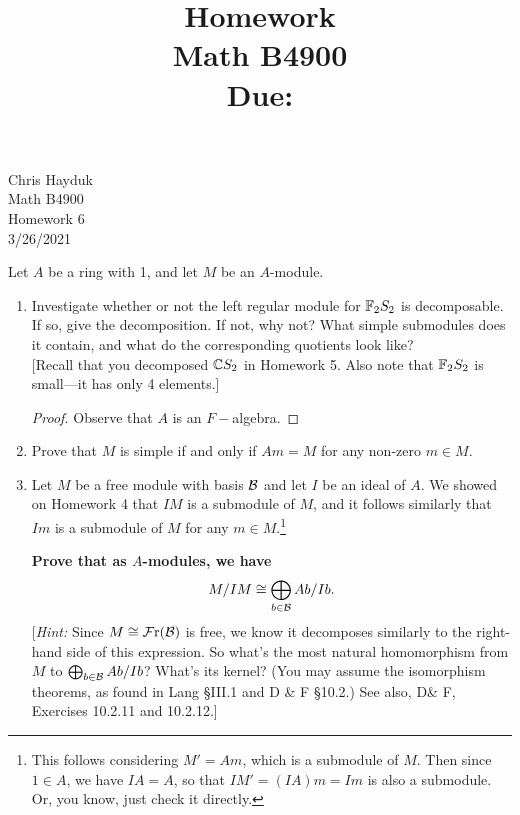 \documentclass[11pt, reqno]{amsart}
\title[Homework \HW]{Homework \HW \\
Math B4900\\
\small Due: \DUE}
\author{}
\theoremstyle{plain}
\theoremstyle{definition}
\theoremstyle{example}
\def\Fr{\mathcal{F}\mathrm{r}}
\def\HW{6}
\def\DUE{3/26/2021}
\begin{document}
\begin{flushright}
Chris Hayduk\\
Math B4900\\
Homework \HW\\
\DUE
\end{flushright}


Let $A$ be a ring with 1, and let $M$ be an $A$-module.
\begin{enumerate}[1.]
\item Investigate whether or not the left regular module for $\mathbb{F}_2 S_2$ is decomposable. If so, give the decomposition. If not, why not? What simple submodules does it contain, and what do the corresponding quotients look like? \\
{[Recall that you decomposed $\mathbb{C} S_2$ in Homework 5.  Also note that $\mathbb{F}_2 S_2$ is small---it has only 4 elements.]}

\begin{proof}
Observe that $A$ is an $F-$algebra.
\end{proof}

\item Prove that $M$ is simple if and only if $Am = M$ for any non-zero $m \in M$. 


\item Let $M$ be a free module with basis $\mathcal{B}$ and let $I$ be an ideal of $A$. We showed on Homework 4 that $IM$ is a submodule of $M$, and it follows similarly that $Im$ is a submodule of $M$ for any $m \in M$.\footnote{This follows considering $M' = Am$, which is a submodule of $M$. Then since $1 \in A$, we have $IA = A$, so that $IM' = (IA)m = Im$ is also a submodule. Or, you know, just check it directly.}

\textbf{Prove that as $A$-modules, we have 
$$M/IM \cong \bigoplus_{b \in \mathcal{B}} Ab/Ib.$$}
{[\emph{Hint:} Since $M \cong \Fr(\cB)$ is free, we know it decomposes similarly to the right-hand side of this expression. So what's the most natural homomorphism from $M$ to $\bigoplus_{b \in \mathcal{B}} Ab/Ib$? What's its kernel? (You may assume the isomorphism theorems, as found in Lang \S III.1 and D \& F \S 10.2.) See also, D\& F, Exercises 10.2.11 and 10.2.12.]}



\end{enumerate}
\end{document}
